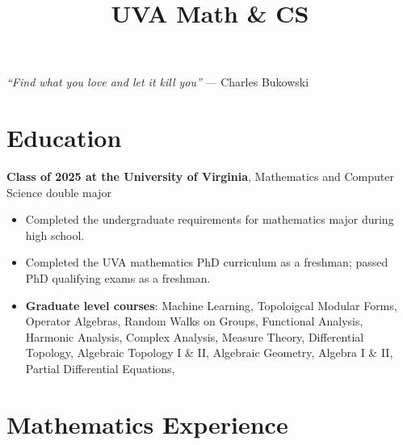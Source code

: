 \documentclass[11pt,letterpaper,sans]{moderncv}
\title{UVA Math \& CS}
\begin{document}
\makecvtitle %
\vspace*{-3.5em}

\vspace*{-1em}
\begin{center}
\textcolor{color1}{\textit{``Find what you love and let it kill you''} --- Charles Bukowski}
\end{center}

%


\section{Education}
\textbf{Class of 2025 at the University of Virginia}, Mathematics and Computer Science double major
\begin{itemize}
  \item Completed the undergraduate requirements for mathematics major during high school.
  \item Completed the UVA mathematics PhD curriculum as a freshman; passed PhD qualifying exams as a freshman.
  \item \textbf{Graduate level courses}: Machine Learning, Topoloigcal Modular Forms, Operator Algebras, Random Walks on Groups, Functional Analysis, Harmonic Analysis, Complex Analysis, Measure Theory, Differential Topology, Algebraic Topology I \& II, Algebraic Geometry, Algebra I \& II, Partial Differential Equations, 
\end{itemize}



\section{Mathematics Experience}

\end{document}
